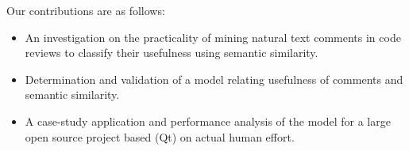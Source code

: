 Our contributions are as follows:
\begin{itemize}
\item An investigation on the practicality of mining natural text comments in code reviews to classify their usefulness using semantic similarity.
\item Determination and validation of a model relating usefulness of comments and semantic similarity.
\item A case-study application and performance analysis of the model for a large open source project based (Qt) on actual human effort.
\end{itemize}





